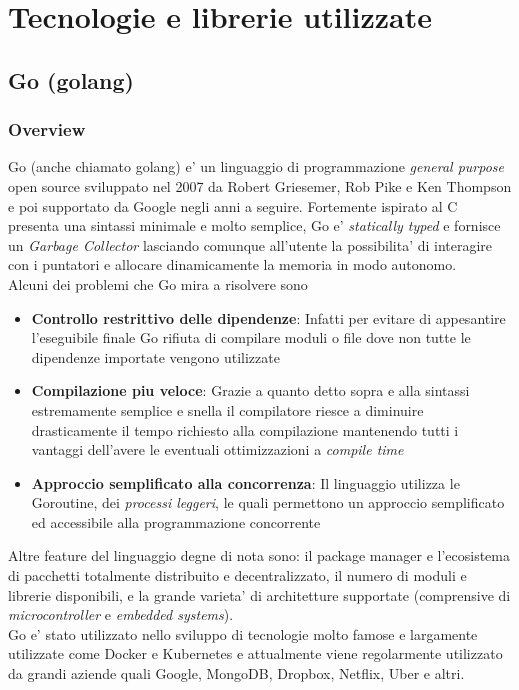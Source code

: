 \chapter{Tecnologie e librerie utilizzate}
\section{Go (golang)}
\subsection{Overview}
Go\cite{Go_Wikipedia} (anche chiamato {golang}) e' un linguaggio di programmazione \emph{general purpose} open source sviluppato nel 2007 da Robert Griesemer, Rob Pike e Ken Thompson e poi supportato da Google negli anni a seguire. Fortemente ispirato al C presenta una sintassi minimale e molto semplice, Go e' \emph{statically typed} e fornisce un \emph{Garbage Collector} lasciando comunque all'utente la possibilita' di interagire con i puntatori e allocare dinamicamente la memoria in modo autonomo.\\
Alcuni dei problemi che Go mira a risolvere sono
\begin{itemize}
    \item \textbf{Controllo restrittivo delle dipendenze}: Infatti per evitare di appesantire l'eseguibile finale Go rifiuta di compilare moduli o file dove non tutte le dipendenze importate vengono utilizzate
    \item \textbf{Compilazione piu veloce}: Grazie a quanto detto sopra e alla sintassi estremamente semplice e snella il compilatore riesce a diminuire drasticamente il tempo richiesto alla compilazione mantenendo tutti i vantaggi dell'avere le eventuali ottimizzazioni a \emph{compile time}
    \item \textbf{Approccio semplificato alla concorrenza}: Il linguaggio utilizza le Goroutine, dei \emph{processi leggeri}, le quali permettono un approccio semplificato ed accessibile alla programmazione concorrente
\end{itemize}
Altre feature del linguaggio degne di nota sono: il package manager e l'ecosistema di pacchetti totalmente distribuito  e decentralizzato, il numero di moduli e librerie disponibili, e la grande varieta' di architetture supportate (comprensive di \emph{microcontroller} e \emph{embedded systems}).\\
Go e' stato utilizzato nello sviluppo di tecnologie molto famose e largamente utilizzate come Docker e Kubernetes e attualmente viene regolarmente utilizzato da grandi aziende quali Google, MongoDB, Dropbox, Netflix, Uber e altri.

